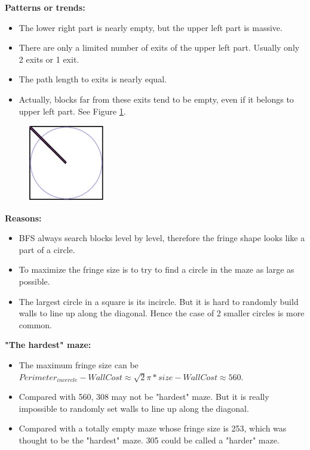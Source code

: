 \documentclass[letter]{article}
\begin{document}
\begin{enumerate}[resume]
\begin{enumerate}
\begin{enumerate}
				\textbf{Patterns or trends:} 
				\begin{itemize}
					\item {The lower right part is nearly empty, but the upper left part is massive.}
					\item {There are only a limited number of exits of the upper left part. Usually only 2 exits or 1 exit.}
					\item {The path length to exits is nearly equal.}
					\item {Actually, blocks far from these exits tend to be empty, even if it belongs to upper left part. See Figure \ref{fig:bf-pattern}.}
				\end{itemize}
				
				\begin{figure}
					\centering
					\includegraphics[width=0.3\textwidth]{../pics/bf/pattern.png}
					\caption{\label{fig:bf-pattern}}
				\end{figure}
				
				\textbf{Reasons:} 
				\begin{itemize}
					\item {BFS always search blocks level by level, therefore the fringe shape looks like a part of a circle.}
					\item {To maximize the fringe size is to try to find a circle in the maze as large as possible.}
					\item {The largest circle in a square is its incircle. But it is hard to randomly build walls to line up along the diagonal. Hence the case of 2 smaller circles is more common.}
				\end{itemize}
				
				\textbf{"The hardest" maze:} 
				\begin{itemize}
					\item {The maximum fringe size can be $Perimeter_{incercle} - WallCost \approx \sqrt2 \pi *size - WallCost \approx 560$.}
					\item {Compared with 560, 308 may not be "hardest" maze. But it is really impossible to randomly set walls to line up along the diagonal.}
					\item {Compared with a totally empty maze whose fringe size is 253, which was thought to be the "hardest" maze. 305 could be called a "harder" maze.}
				\end{itemize}
			\end{enumerate}
			

\end{enumerate}
\end{enumerate}
\end{document}
